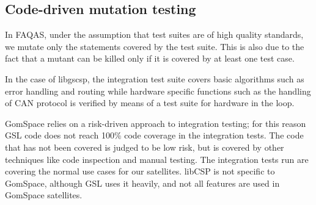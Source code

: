 

\subsection{Code-driven mutation testing}



In FAQAS, under the assumption that test suites are of high quality standards, we mutate only the statements covered by the test suite. This is also due to the fact that a mutant can be killed only if it is covered by at least one test case. 

In the case of libgscsp, the integration test suite covers basic algorithms such as error handling and routing while hardware specific functions such as the handling of CAN protocol is verified by means of a test suite for hardware in the loop. 

GomSpace relies on a risk-driven approach to integration testing; for this reason GSL code does not reach 100\% code coverage in the integration tests. The code that has not been covered is judged to be low risk, but is covered by other techniques like code inspection and manual testing. The integration tests run are covering the normal use cases for our satellites. libCSP is not specific to GomSpace, although GSL uses it heavily, and not all features are used in GomSpace satellites.


	

